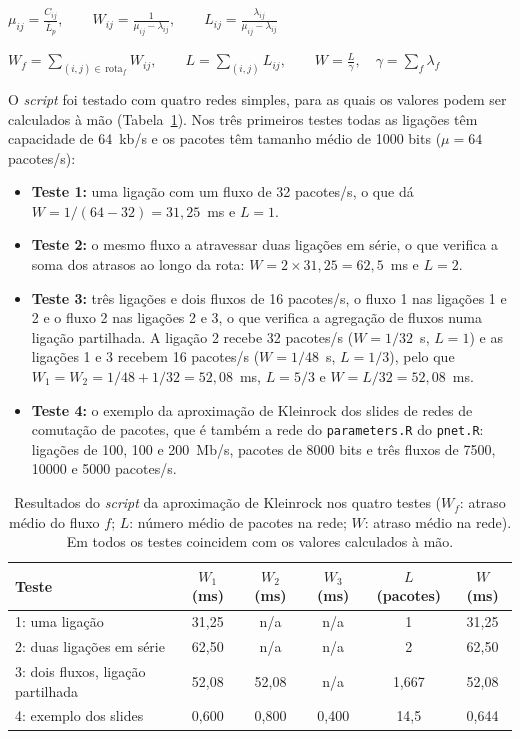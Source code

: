 \documentclass[10pt,a4paper]{article}
\newcommand{\formula}[3]{\begin{equacao}[H]\centering$\displaystyle #1$\caption{#2}\label{#3}\end{equacao}}
\begin{document}
\formula{\mu_{ij}=\frac{C_{ij}}{\overline{L}_p},\qquad W_{ij}=\frac{1}{\mu_{ij}-\lambda_{ij}},\qquad L_{ij}=\frac{\lambda_{ij}}{\mu_{ij}-\lambda_{ij}}}{Taxa de serviço, atraso médio e número médio de pacotes na ligação $(i,j)$.}{eq:kleinlink}

\formula{W_f=\sum_{(i,j)\in\,\text{rota}_f}W_{ij},\qquad L=\sum_{(i,j)}L_{ij},\qquad W=\frac{L}{\gamma},\quad \gamma=\sum_f\lambda_f}{Atraso médio de cada fluxo, número médio de pacotes na rede e atraso médio na rede.}{eq:kleinrede}

O \textit{script} foi testado com quatro redes simples, para as quais os valores podem ser calculados à mão (Tabela~\ref{tab:ex11}). Nos três primeiros testes todas as ligações têm capacidade de 64~kb/s e os pacotes têm tamanho médio de 1000 bits ($\mu=64$ pacotes/s):
\begin{itemize}
  \item \textbf{Teste 1:} uma ligação com um fluxo de 32 pacotes/s, o que dá $W=1/(64-32)=31{,}25$~ms e $L=1$.
  \item \textbf{Teste 2:} o mesmo fluxo a atravessar duas ligações em série, o que verifica a soma dos atrasos ao longo da rota: $W=2\times31{,}25=62{,}5$~ms e $L=2$.
  \item \textbf{Teste 3:} três ligações e dois fluxos de 16 pacotes/s, o fluxo 1 nas ligações 1 e 2 e o fluxo 2 nas ligações 2 e 3, o que verifica a agregação de fluxos numa ligação partilhada. A ligação 2 recebe 32 pacotes/s ($W=1/32$~s, $L=1$) e as ligações 1 e 3 recebem 16 pacotes/s ($W=1/48$~s, $L=1/3$), pelo que $W_1=W_2=1/48+1/32=52{,}08$~ms, $L=5/3$ e $W=L/32=52{,}08$~ms.
  \item \textbf{Teste 4:} o exemplo da aproximação de Kleinrock dos slides de redes de comutação de pacotes, que é também a rede do \texttt{parameters.R} do \texttt{pnet.R}: ligações de 100, 100 e 200~Mb/s, pacotes de 8000 bits e três fluxos de 7500, \num{10000} e 5000 pacotes/s.
\end{itemize}

\begin{table}[H]
\centering
\begin{tabular}{lccccc}
\toprule
Teste & $W_1$ (ms) & $W_2$ (ms) & $W_3$ (ms) & $L$ (pacotes) & $W$ (ms)\\
\midrule
1: uma ligação & 31,25 & n/a & n/a & 1 & 31,25\\
2: duas ligações em série & 62,50 & n/a & n/a & 2 & 62,50\\
3: dois fluxos, ligação partilhada & 52,08 & 52,08 & n/a & 1,667 & 52,08\\
4: exemplo dos slides & 0,600 & 0,800 & 0,400 & 14,5 & 0,644\\
\bottomrule
\end{tabular}
\caption{Resultados do \textit{script} da aproximação de Kleinrock nos quatro testes ($W_f$: atraso médio do fluxo $f$; $L$: número médio de pacotes na rede; $W$: atraso médio na rede). Em todos os testes coincidem com os valores calculados à mão.}
\label{tab:ex11}
\end{table}
\end{document}
